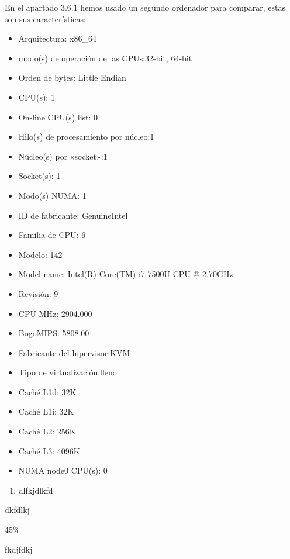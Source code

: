 \documentclass{article}
\begin{document}
En el apartado 3.6.1 hemos usado un segundo ordenador para comparar, estas son sus características:
\begin{itemize}
	\item Arquitectura:          x86\_64
	\item modo(s) de operación de las CPUs:32-bit, 64-bit
	\item Orden de bytes:        Little Endian
	\item CPU(s):                1
	\item On-line CPU(s) list:   0
	\item Hilo(s) de procesamiento por núcleo:1
	\item Núcleo(s) por «socket»:1
	\item Socket(s):             1
	\item Modo(s) NUMA:          1
	\item ID de fabricante:      GenuineIntel
	\item Familia de CPU:        6
	\item Modelo:                142
	\item Model name:            Intel(R) Core(TM) i7-7500U CPU @ 2.70GHz
	\item Revisión:             9
	\item CPU MHz:               2904.000
	\item BogoMIPS:              5808.00
	\item Fabricante del hipervisor:KVM
	\item Tipo de virtualización:lleno
	\item Caché L1d:            32K
	\item Caché L1i:            32K
	\item Caché L2:             256K
	\item Caché L3:             4096K
	\item NUMA node0 CPU(s):     0
\end{itemize}

\begin{enumerate}
	\item dlfkjdlkfd
\end{enumerate}

dkfdlkj



45\%

fkdjfdkj
\end{document}
